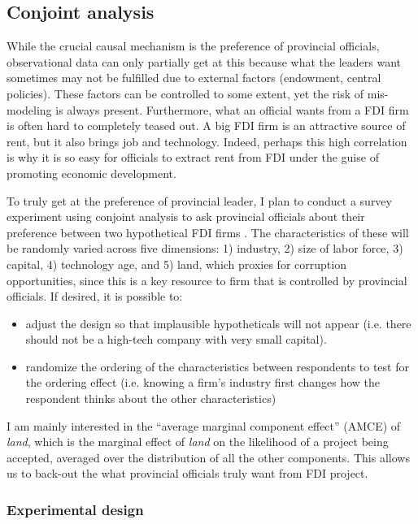 \subsection{Conjoint analysis}

While the crucial causal mechanism is the preference of provincial officials, observational data can only partially get at this because what the leaders want sometimes may not be fulfilled due to external factors (endowment, central policies). These factors can be controlled to some extent, yet the risk of mis-modeling is always present. Furthermore, what an official wants from a FDI firm is often hard to completely teased out. A big FDI firm is an attractive source of rent, but it also brings job and technology. Indeed, perhaps this high correlation is why it is so easy for officials to extract rent from FDI under the guise of promoting economic development.

To truly get at the preference of provincial leader, I plan to conduct a survey experiment using conjoint analysis to ask provincial officials about their preference between two hypothetical FDI firms \citep{Hainmueller2014}. The characteristics of these will be randomly varied across five dimensions: 1) industry, 2) size of labor force, 3) capital, 4) technology age, and 5) land, which proxies for corruption opportunities, since this is a key resource to firm that is controlled by provincial officials. If desired, it is possible to:
\begin{itemize}
\item adjust the design so that implausible hypotheticals will not appear (i.e. there should not be a high-tech company with very small capital).
\item randomize the ordering of the characteristics between respondents to test for the ordering effect (i.e. knowing a firm's industry first changes how the respondent thinks about the other characteristics)
\end{itemize}

I am mainly interested in the ``average marginal component effect'' (AMCE) of \textit{land}, which is the marginal effect of \textit{land} on the likelihood of a project being accepted, averaged over the distribution of all the other components. This allows us to back-out the what provincial officials truly want from FDI project.

\subsubsection{Experimental design}

